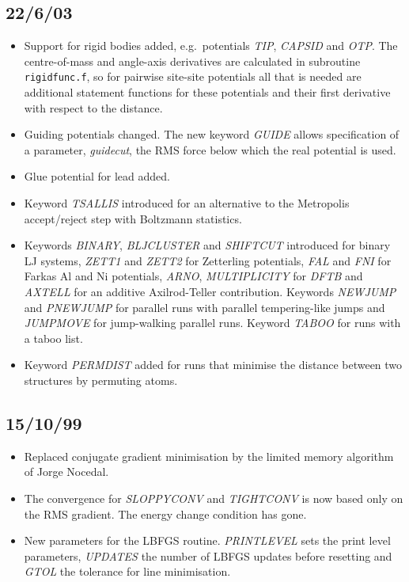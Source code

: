 \documentclass[12pt,a4paper,dvips]{article}
\begin{document}
\subsection{22/6/03}
\begin{itemize}
\item Support for rigid bodies added, e.g.~potentials {\it TIP\/}, {\it CAPSID\/} and {\it OTP\/}.
The centre-of-mass and angle-axis derivatives are calculated in subroutine {\tt rigidfunc.f}, so for pairwise
site-site potentials all that is needed are additional statement functions for these potentials and their
first derivative with respect to the distance.
\item Guiding potentials changed. The new keyword {\it GUIDE\/} allows specification of a parameter,
{\it guidecut\/}, the RMS force below which the real potential is used. 
\item Glue potential for lead added.
\item Keyword {\it TSALLIS\/} introduced for an alternative to the Metropolis
accept/reject step with Boltzmann statistics.
\item Keywords {\it BINARY\/}, {\it BLJCLUSTER\/} and {\it SHIFTCUT\/} introduced for binary LJ systems,
{\it ZETT1\/} and {\it ZETT2\/} for Zetterling potentials, {\it FAL\/} and {\it FNI\/} for Farkas Al and Ni
potentials, {\it ARNO\/}, {\it MULTIPLICITY\/} for {\it DFTB\/} and 
{\it AXTELL\/} for an additive Axilrod-Teller contribution.
Keywords {\it NEWJUMP\/} and {\it PNEWJUMP\/} for parallel runs with parallel tempering-like jumps
and {\it JUMPMOVE\/} for jump-walking parallel runs.
Keyword {\it TABOO\/} for runs with a taboo list.
\item Keyword {\it PERMDIST\/} added for runs that minimise the distance between two structures by permuting
atoms.

\end{itemize}

\subsection{15/10/99}
\begin{itemize}
\item Replaced conjugate gradient minimisation by the limited memory algorithm
      of Jorge Nocedal\cite{lbfgs}.
\item The convergence for {\it SLOPPYCONV\/} and {\it TIGHTCONV\/} is now
      based only on the RMS gradient. The energy change condition has gone.
\item New parameters for the LBFGS routine. {\it PRINTLEVEL\/} sets the 
      print level parameters, {\it UPDATES\/} the number of LBFGS updates
      before resetting and {\it GTOL\/} the tolerance for line minimisation.
\end{itemize}



\cleardoublepage
{}
{}



\end{document}
